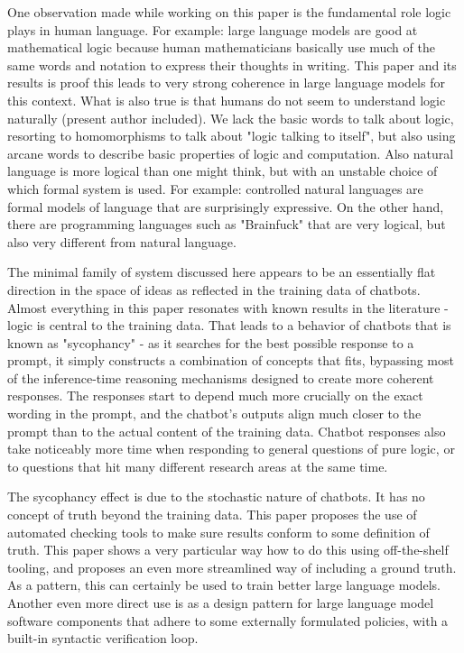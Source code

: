 One observation made while working on this paper is the fundamental role logic plays in human language. For example: large language models are good at mathematical logic because human mathematicians basically use much of the same words and notation to express their thoughts in writing. This paper and its results is proof this leads to very strong coherence in large language models for this context. What is also true is that humans do not seem to understand logic naturally (present author included). We lack the basic words to talk about logic, resorting to homomorphisms to talk about "logic talking to itself", but also using arcane words to describe basic properties of logic and computation. Also natural language is more logical than one might think, but with an unstable choice of which formal system is used. For example: controlled natural languages are formal models of language that are surprisingly expressive. On the other hand, there are programming languages such as "Brainfuck" that are very logical, but also very different from natural language. 

The minimal family of system discussed here appears to be an essentially flat direction in the space of ideas as reflected in the training data of chatbots. Almost everything in this paper resonates with known results in the literature - logic is central to the training data. That leads to a behavior of chatbots that is known as "sycophancy" - as it searches for the best possible response to a prompt, it simply constructs a combination of concepts that fits, bypassing most of the inference-time reasoning mechanisms designed to create more coherent responses. The responses start to depend much more crucially on the exact wording in the prompt, and the chatbot's outputs align much closer to the prompt than to the actual content of the training data. Chatbot responses also take noticeably more time when responding to general questions of pure logic, or to questions that hit many different research areas at the same time. 

The sycophancy effect is due to the stochastic nature of chatbots. It has no concept of truth beyond the training data. This paper proposes the use of automated checking tools to make sure results conform to some definition of truth. This paper shows a very particular way how to do this using off-the-shelf tooling, and proposes an even more streamlined way of including a ground truth. As a pattern, this can certainly be used to train better large language models. Another even more direct use is as a design pattern for large language model software components that adhere to some externally formulated policies, with a built-in syntactic verification loop. 
